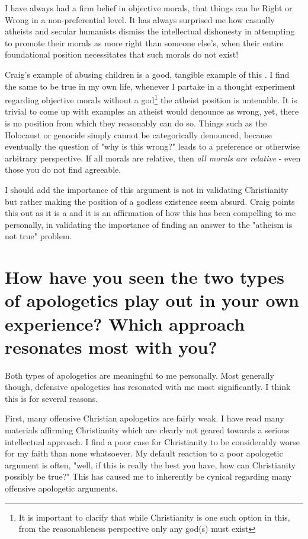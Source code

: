I have always had a firm belief in objective morals, that things can be Right or Wrong in a non-preferential level. It has always surprised me how casually atheists and secular humanists dismiss the intellectual dishonesty in attempting to promote their morals as more right than someone else's, when their entire foundational position necessitates that such morals do not exist!

Craig's example of abusing children is a good, tangible example of this \autocite[pg. 87-88]{craig2008reasonable}. I find the same to be true in my own life, whenever I partake in a thought experiment regarding objective morals without a god\footnote{It is important to clarify that while Christianity is one such option in this, from the reasonableness perspective only any god(s) must exist} the atheist position is untenable. It is trivial to come up with examples an atheist would denounce as wrong, yet, there is no position from which they reasonably can do so. Things such as the Holocaust or genocide simply cannot be categorically denounced, because eventually the question of "why is this wrong?" leads to a preference or otherwise arbitrary perspective. If all morals are relative, then \textit{all morals are relative} - even those you do not find agreeable.

I should add the importance of this argument is not in validating Christianity but rather making the position of a godless existence seem absurd. Craig points this out as it is a and it is an affirmation of how this has been compelling to me personally, in validating the importance of finding an answer to the "atheism is not true" problem.



\section{How have you seen the two types of apologetics play out in your own experience? Which approach resonates most with you?}

Both types of apologetics are meaningful to me personally. Most generally though, defensive apologetics has resonated with me most significantly. I think this is for several reasons.

First, many offensive Christian apologetics are fairly weak. I have read many materials affirming Christianity which are clearly not geared towards a serious intellectual approach. I find a poor case for Christianity to be considerably worse for my faith than none whatsoever. My default reaction to a poor apologetic argument is often, "well, if this is really the best you have, how can Christianity possibly be true?" This has caused me to inherently be cynical regarding many offensive apologetic arguments.

